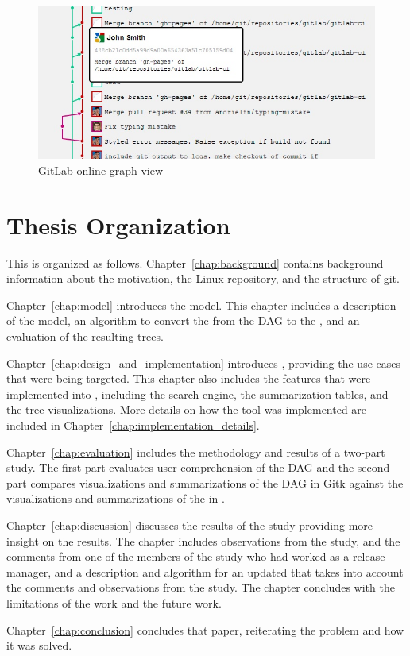 \begin{figure}[htpb]
  \centering
  \includegraphics[width=0.8\linewidth]{Figures/introduction/gitlab_graph.jpg}
  \caption{GitLab online graph view}
  \label{fig:gitlab_dag_screenshot}
\end{figure}

\section{Thesis Organization}\label{sec:thesis_organization}

This \paper{} is organized as follows. Chapter~\ref{chap:background}
contains background information about the motivation, the Linux
repository, and the structure of git.

Chapter~\ref{chap:model} introduces the \mt{} model. This chapter
includes a description of the model, an algorithm to convert the from
the DAG to the \mt{}, and an evaluation of the resulting trees.

Chapter~\ref{chap:design_and_implementation} introduces \tool{},
providing the use-cases that were being targeted. This chapter also
includes the features that were implemented into \tool{}, including the
search engine, the summarization tables, and the tree visualizations.
More details on how the tool was implemented are included in
Chapter~\ref{chap:implementation_details}.

Chapter~\ref{chap:evaluation} includes the methodology and results of a
two-part study. The first part evaluates user comprehension of the DAG
and the second part compares visualizations and summarizations of the
DAG in Gitk against the visualizations and summarizations of the \mt{}
in \tool{}.

Chapter~\ref{chap:discussion} discusses the results of the study
providing more insight on the results. The chapter includes observations
from the study, and the comments from one of the members of the study
who had worked as a release manager, and a description and algorithm for
an updated \mt{} that takes into account the comments and observations
from the study. The chapter concludes with the limitations of the work
and the future work.

Chapter~\ref{chap:conclusion} concludes that paper, reiterating the
problem and how it was solved.
